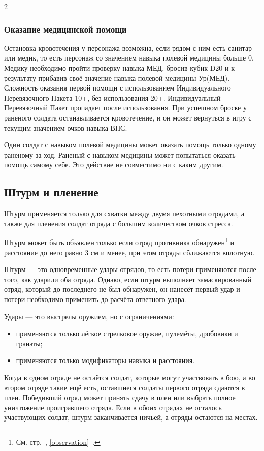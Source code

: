 \documentclass[twoside]{article}
\begin{document}
\begin{multicols}{2}
\subsubsection{Оказание медицинской помощи}\label{first-aid}

Остановка кровотечения у персонажа возможна, если рядом с ним есть
санитар или медик, то есть персонаж со значением навыка полевой медицины
больше 0. Медику необходимо пройти проверку навыка МЕД, бросив кубик D20
и к результату прибавив своё значение навыка полевой медицины Ур(МЕД).
Сложность оказания первой помощи с использованием Индивидуального Перевязочного Пакета 10+, без использования 20+.
Индивидуальный Перевязочный Пакет пропадает после использования.
При успешном броске у раненого солдата останавливается кровотечение, и
он может вернуться в игру с текущим значением очков навыка ВНС.

Один солдат с навыком полевой медицины может оказать помощь только
одному раненому за ход. Раненый с навыком медицины может попытаться
оказать помощь самому себе. Это действие не совместимо ни с каким
другим.

\subsection{Штурм и пленение}\label{assault}

Штурм применяется только для схватки между двумя пехотными отрядами, а
также для пленения солдат отряда с большим количеством очков стресса.

Штурм может быть объявлен только если отряд противника
обнаружен\footnote{См. стр.~\pageref{observation}, \ref{observation}~.} и расстояние до него равно 3 см и менее, при этом
отряды сближаются вплотную.

Штурм --- это одновременные удары отрядов, то есть потери применяются
после того, как ударили оба отряда. Однако, если штурм выполняет
замаскированный отряд, который до последнего не был обнаружен, он
нанесёт первый удар и потери необходимо применить до расчёта ответного
удара.

Удары --- это выстрелы оружием, но с ограничениями:

\begin{itemize}
\item
  применяются только лёгкое стрелковое оружие, пулемёты, дробовики и
  гранаты;
\item
  применяются только модификаторы навыка и расстояния.
\end{itemize}

Когда в одном отряде не остаётся солдат, которые могут участвовать в
бою, а во втором отряде такие ещё есть, оставшиеся солдаты первого
отряда сдаются в плен. Победивший отряд может принять сдачу в плен или
выбрать полное уничтожение проигравшего отряда. Если в обоих отрядах не
осталось участвующих солдат, штурм заканчивается ничьей, а отряды
остаются на местах.

\end{multicols}
\clearpage
\begingroup
\footnotesize
\end{document}

